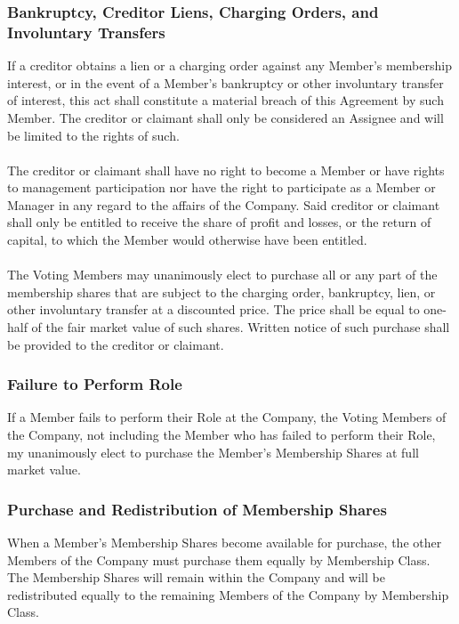 \documentclass[11pt]{article}
\begin{document}
\subsubsection{Bankruptcy, Creditor Liens, Charging Orders, and Involuntary Transfers}
If a creditor obtains a lien or a charging order against any Member's membership interest, or in the event of a Member's bankruptcy or other involuntary transfer of interest, this act shall constitute a material breach of this Agreement by such Member. The creditor or claimant shall only be considered an Assignee and will be limited to the rights of such.\\\\
The creditor or claimant shall have no right to become a Member or have rights to management participation nor have the right to participate as a Member or Manager in any regard to the affairs of the Company. Said creditor or claimant shall only be entitled to receive the share of profit and losses, or the return of capital, to which the Member would otherwise have been entitled.\\\\
The Voting Members may unanimously elect to purchase all or any part of the membership shares that are subject to the charging order, bankruptcy, lien, or other involuntary transfer at a discounted price. The price shall be equal to one-half of the fair market value of such shares. Written notice of such purchase shall be provided to the creditor or claimant.

\subsubsection{Failure to Perform Role}
If a Member fails to perform their Role at the Company, the Voting Members of the Company, not including the Member who has failed to perform their Role, my unanimously elect to purchase the Member's Membership Shares at full market value.

\subsubsection{Purchase and Redistribution of Membership Shares}
When a Member's Membership Shares become available for purchase, the other Members of the Company must purchase them equally by Membership Class. The Membership Shares will remain within the Company and will be redistributed equally to the remaining Members of the Company by Membership Class.
\end{document}
